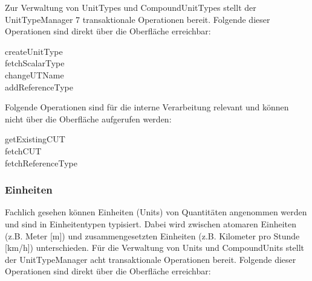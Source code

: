 Zur Verwaltung von UnitTypes und CompoundUnitTypes stellt der UnitTypeManager 7 transaktionale Operationen bereit. Folgende dieser Operationen sind direkt über die Oberfläche erreichbar:

\begin{description}
\item[createUnitType]
\item[fetchScalarType]
\item[changeUTName]
\item[addReferenceType]
\end{description}

Folgende Operationen sind für die interne Verarbeitung relevant und können nicht über die Oberfläche aufgerufen werden:

\begin{description}
\item[getExistingCUT]
\item[fetchCUT]
\item[fetchReferenceType]
\end{description}


\subsubsection{Einheiten}
Fachlich gesehen können Einheiten (Units) von Quantitäten angenommen werden und sind in Einheitentypen typisiert.
Dabei wird zwischen atomaren Einheiten (z.B. Meter [m]) und zusammengesetzten Einheiten (z.B. Kilometer pro Stunde [km/h]) unterschieden.
 \newline
Für die Verwaltung von Units und CompoundUnits stellt der UnitTypeManager acht transaktionale Operationen bereit.
Folgende dieser Operationen sind direkt über die Oberfläche erreichbar:

